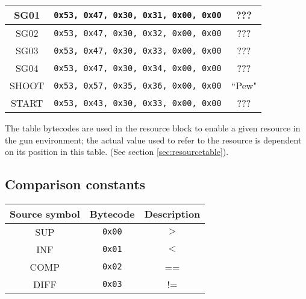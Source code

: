 \documentclass[12pt,a4paper]{scrbook}
\begin{document}
\begin{center}
\begin{tabular}{ | c | c || c | }
    SG01 & \texttt{0x53, 0x47, 0x30, 0x31, 0x00, 0x00} & ???  \\ \hline
    SG02 & \texttt{0x53, 0x47, 0x30, 0x32, 0x00, 0x00} & ???  \\ \hline
    SG03 & \texttt{0x53, 0x47, 0x30, 0x33, 0x00, 0x00} & ???  \\ \hline
    SG04 & \texttt{0x53, 0x47, 0x30, 0x34, 0x00, 0x00} & ???  \\ \hline  
    SHOOT & \texttt{0x53, 0x57, 0x35, 0x36, 0x00, 0x00} & ``Pew"  \\ \hline
    START & \texttt{0x53, 0x43, 0x30, 0x33, 0x00, 0x00} & ???  \\ \hline
  \end{tabular}
\end{center}
The table bytecodes are used in the resource block to enable a given resource in the gun 
environment; the actual value used to refer to the resource is dependent on its position in this
table.  (See section \ref{sec:resourcetable}).	


\subsection{Comparison constants}
\label{sec:compconsts}
\begin{center}
  \begin{tabular}{ | c | c || c | }
    \hline
    Source symbol & Bytecode & Description \\ \hline \hline
    SUP & \texttt{0x00} & $>$  \\ \hline
    INF & \texttt{0x01} & $<$  \\ \hline
    COMP & \texttt{0x02} & ==  \\ \hline
    DIFF & \texttt{0x03} & !=  \\ \hline
    
  \end{tabular}
\end{center}

\end{document}
